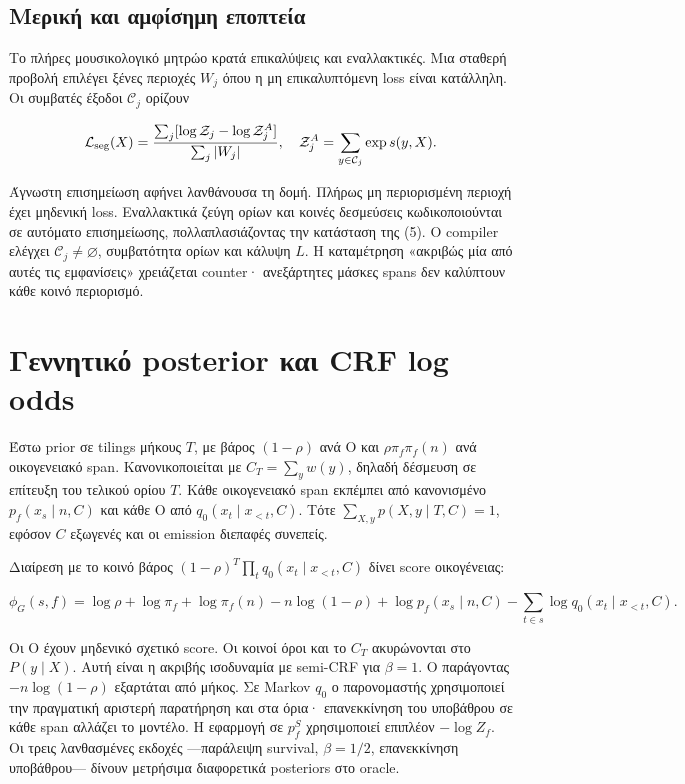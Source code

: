 \documentclass[
  10pt,
  a4paper,
]{report}
\begin{document}
\subsection{Μερική και αμφίσημη
εποπτεία}\label{ux3bcux3b5ux3c1ux3b9ux3baux3ae-ux3baux3b1ux3b9-ux3b1ux3bcux3c6ux3afux3c3ux3b7ux3bcux3b7-ux3b5ux3c0ux3bfux3c0ux3c4ux3b5ux3afux3b1}

Το πλήρες μουσικολογικό μητρώο κρατά επικαλύψεις και εναλλακτικές. Μια
σταθερή προβολή επιλέγει ξένες περιοχές \(W_j\) όπου η μη επικαλυπτόμενη
loss είναι κατάλληλη. Οι συμβατές έξοδοι \(\mathcal C_j\) ορίζουν

\[
\mathcal L_{\rm seg}(X)=\frac{\sum_j[\log\mathcal Z_j-\log\mathcal Z_j^{A}]}{\sum_j|W_j|},
\quad \mathcal Z_j^A=\sum_{y\in\mathcal C_j}\exp s(y,X).
\]

Άγνωστη επισημείωση αφήνει λανθάνουσα τη δομή. Πλήρως μη περιορισμένη
περιοχή έχει μηδενική loss. Εναλλακτικά ζεύγη ορίων και κοινές
δεσμεύσεις κωδικοποιούνται σε αυτόματο επισημείωσης, πολλαπλασιάζοντας
την κατάσταση της (5). Ο compiler ελέγχει
\(\mathcal C_j\ne\varnothing\), συμβατότητα ορίων και κάλυψη \(L\). Η
καταμέτρηση «ακριβώς μία από αυτές τις εμφανίσεις» χρειάζεται counter·
ανεξάρτητες μάσκες spans δεν καλύπτουν κάθε κοινό περιορισμό.

\section{Γεννητικό posterior και CRF log
odds}\label{ux3b3ux3b5ux3bdux3bdux3b7ux3c4ux3b9ux3baux3cc-posterior-ux3baux3b1ux3b9-crf-log-odds}

Έστω prior σε tilings μήκους \(T\), με βάρος \((1-\rho)\) ανά O και
\(\rho\pi_f\pi_f(n)\) ανά οικογενειακό span. Κανονικοποιείται με
\(C_T=\sum_y w(y)\), δηλαδή δέσμευση σε επίτευξη του τελικού ορίου
\(T\). Κάθε οικογενειακό span εκπέμπει από κανονισμένο
\(p_f(x_s\mid n,C)\) και κάθε O από \(q_0(x_t\mid x_{<t},C)\). Τότε
\(\sum_{X,y}p(X,y\mid T,C)=1\), εφόσον \(C\) εξωγενές και οι emission
διεπαφές συνεπείς.

Διαίρεση με το κοινό βάρος \((1-\rho)^T\prod_tq_0(x_t\mid x_{<t},C)\)
δίνει score οικογένειας:

\[
\phi_G(s,f)=\log\rho+\log\pi_f+\log\pi_f(n)-n\log(1-\rho)
+\log p_f(x_s\mid n,C)-\sum_{t\in s}\log q_0(x_t\mid x_{<t},C).
\]

Οι O έχουν μηδενικό σχετικό score. Οι κοινοί όροι και το \(C_T\)
ακυρώνονται στο \(P(y\mid X)\). Αυτή είναι η ακριβής ισοδυναμία με
semi-CRF για \(\beta=1\). Ο παράγοντας \(-n\log(1-\rho)\) εξαρτάται από
μήκος. Σε Markov \(q_0\) ο παρονομαστής χρησιμοποιεί την πραγματική
αριστερή παρατήρηση και στα όρια· επανεκκίνηση του υποβάθρου σε κάθε
span αλλάζει το μοντέλο. Η εφαρμογή σε \(p_f^S\) χρησιμοποιεί επιπλέον
\(-\log Z_f\). Οι τρεις λανθασμένες εκδοχές ---παράλειψη survival,
\(\beta=1/2\), επανεκκίνηση υποβάθρου--- δίνουν μετρήσιμα διαφορετικά
posteriors στο oracle.
\end{document}
